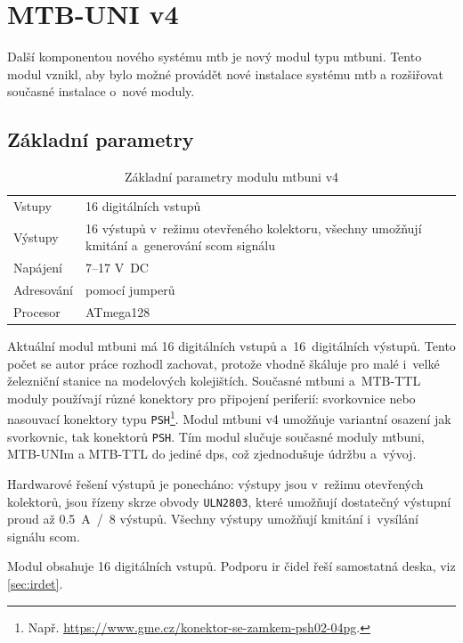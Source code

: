 \newpage
\section{MTB-UNI v4}

Další komponentou nového systému \gls{mtb} je nový modul typu \gls{mtbuni}.
Tento modul vznikl, aby bylo možné provádět nové instalace systému \gls{mtb}
a rozšiřovat současné instalace o~nové moduly.

\subsection{Základní parametry}

\begin{table}[ht]
	\begin{tabularx}{\textwidth}{lX}
		\toprule
		Vstupy & 16 digitálních vstupů \\
		Výstupy & 16 výstupů v~režimu otevřeného kolektoru, všechny umožňují
		kmitání a~generování \gls{scom} signálu \\
		Napájení & 7–17 V~DC \\
		Adresování & pomocí jumperů \\
		Procesor & ATmega128 \\
		\bottomrule
	\end{tabularx}
	\caption{Základní parametry modulu \gls{mtbuni} v4}
	\label{tab:mtbuni-params}
\end{table}

Aktuální modul \gls{mtbuni} má 16 digitálních vstupů a~16~digitálních výstupů.
Tento počet se autor práce rozhodl zachovat, protože vhodně škáluje pro malé
i~velké železniční stanice na modelových kolejištích.
Současné \gls{mtbuni} a~MTB-TTL moduly používají různé konektory
pro připojení periferií: svorkovnice nebo nasouvací konektory typu
\texttt{PSH}\footnote{Např. \url{https://www.gme.cz/konektor-se-zamkem-psh02-04pg}.}.
Modul \gls{mtbuni} v4 umožňuje variantní osazení jak svorkovnic, tak konektorů
\texttt{PSH}. Tím modul slučuje současné moduly \gls{mtbuni}, MTB-UNIm a
MTB-TTL do jediné \gls{dps}, což zjednodušuje údržbu a~vývoj.

Hardwarové řešení výstupů je ponecháno: výstupy jsou v~režimu otevřených
kolektorů, jsou řízeny skrze obvody \texttt{ULN2803}, které umožňují
dostatečný výstupní proud až 0.5~A~/~8 výstupů. Všechny výstupy umožňují kmitání
i~vysílání signálu \gls{scom}.

Modul obsahuje 16 digitálních vstupů. Podporu \gls{ir} čidel řeší samostatná
deska, viz \ref{sec:irdet}.

